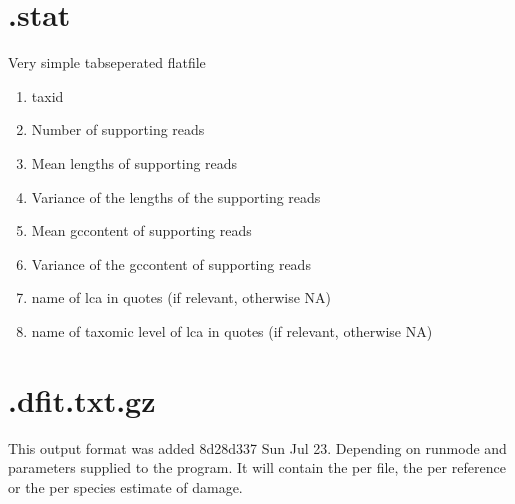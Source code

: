 \documentclass[10pt]{article}
\begin{document}
\section{.stat}\label{sec:stat}
Very simple tabseperated flatfile
\begin{enumerate}
\item taxid
\item Number of supporting reads
\item Mean lengths of supporting reads
\item Variance of the lengths of the supporting reads
\item Mean gccontent of supporting reads
\item Variance of the gccontent of supporting reads
\item name of lca in quotes (if relevant, otherwise NA)
\item name of taxomic level of lca in quotes (if relevant, otherwise NA)
\end{enumerate}
\clearpage
\section{.dfit.txt.gz}
This output format was added 8d28d337 Sun Jul 23.  Depending on
runmode and parameters supplied to the program. It will contain the
per file, the per reference or the per species estimate of damage.
\end{document}
